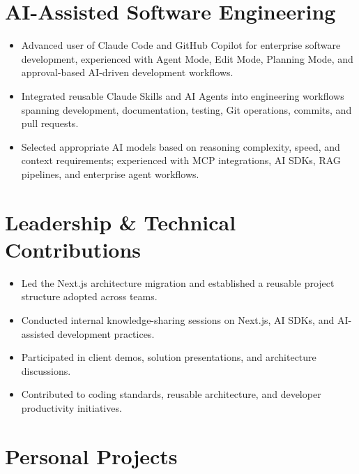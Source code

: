 \documentclass[a4paper,10.5pt]{article}
\begin{document}
\section*{AI-Assisted Software Engineering}
\begin{itemize}
\item Advanced user of Claude Code and GitHub Copilot for enterprise software development, experienced with Agent Mode, Edit Mode, Planning Mode, and approval-based AI-driven development workflows.
\item Integrated reusable Claude Skills and AI Agents into engineering workflows spanning development, documentation, testing, Git operations, commits, and pull requests.
\item Selected appropriate AI models based on reasoning complexity, speed, and context requirements; experienced with MCP integrations, AI SDKs, RAG pipelines, and enterprise agent workflows.
\end{itemize}

\section*{Leadership \& Technical Contributions}
\begin{itemize}
\item Led the Next.js architecture migration and established a reusable project structure adopted across teams.
\item Conducted internal knowledge-sharing sessions on Next.js, AI SDKs, and AI-assisted development practices.
\item Participated in client demos, solution presentations, and architecture discussions.
\item Contributed to coding standards, reusable architecture, and developer productivity initiatives.
\end{itemize}

\section*{Personal Projects}
\end{document}
